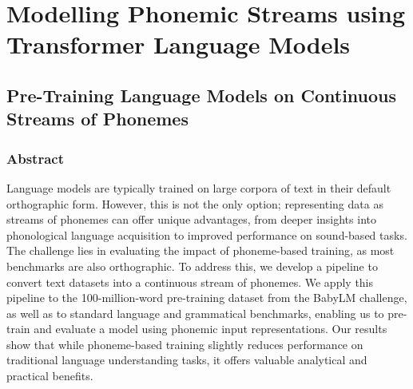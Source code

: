 \chapter{Modelling Phonemic Streams using Transformer Language Models}







\section{Pre-Training Language Models on Continuous Streams of Phonemes}


\subsection{Abstract}

Language models are typically trained on large corpora of text in their default orthographic form. However, this is not the only option; representing data as streams of phonemes can offer unique advantages, from deeper insights into phonological language acquisition to improved performance on sound-based tasks. The challenge lies in evaluating the impact of phoneme-based training, as most benchmarks are also orthographic. To address this, we develop a pipeline to convert text datasets into a continuous stream of phonemes. We apply this pipeline to the 100-million-word pre-training dataset from the BabyLM challenge, as well as to standard language and grammatical benchmarks, enabling us to pre-train and evaluate a model using phonemic input representations. Our results show that while phoneme-based training slightly reduces performance on traditional language understanding tasks, it offers valuable analytical and practical benefits. 

